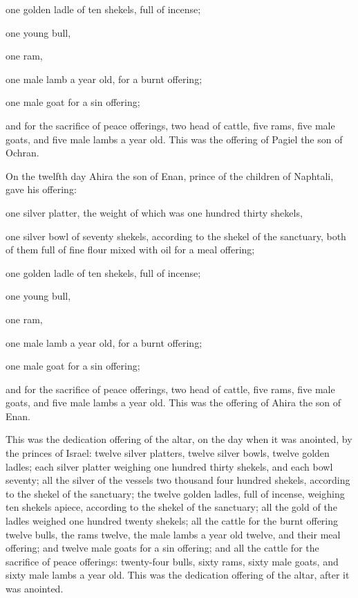 \myverse{}one golden ladle of ten shekels, full of incense;


\myverse{}one young bull,

one ram,

one male lamb a year old, for a burnt offering;


\myverse{}one male goat for a sin offering;


\myverse{}and for the sacrifice of peace offerings, two head of cattle,
five rams, five male goats, and five male lambs a year old. This was the offering of Pagiel the son of
Ochran.


\myverse{}On the twelfth day Ahira the son of Enan, prince of the children
of Naphtali,
\myverse{}gave his offering:

one silver platter, the weight of which was one hundred thirty shekels,

one silver bowl of seventy shekels, according to the shekel of the sanctuary, both of them
full of fine flour mixed with oil for a meal offering;


\myverse{}one golden ladle of ten shekels, full of incense;


\myverse{}one young bull,

one ram,

one male lamb a year old, for a burnt offering;


\myverse{}one male goat for a sin offering;


\myverse{}and for the sacrifice of peace offerings, two head of cattle,
five rams, five male goats, and five male lambs a year old. This was the offering of Ahira the son of
Enan.


\myverse{}This was the dedication offering of the altar, on the day when
it was anointed, by the princes of Israel: twelve silver platters, twelve silver bowls, twelve golden
ladles;
\myverse{}each silver platter weighing one hundred thirty shekels, and each bowl seventy;
all the silver of the vessels two thousand four hundred shekels, according to the shekel of the sanctuary;
\myverse{}the twelve golden ladles, full of incense, weighing ten shekels apiece, according
to the shekel of the sanctuary; all the gold of the ladles weighed one hundred twenty shekels;
\myverse{}all the cattle for the burnt offering twelve bulls, the rams twelve, the male
lambs a year old twelve, and their meal offering; and twelve male goats for a sin offering;
\myverse{}and all the cattle for the sacrifice of peace offerings: twenty-four bulls,
sixty rams, sixty male goats, and sixty male lambs a year old. This was the dedication offering of the
altar, after it was anointed.


